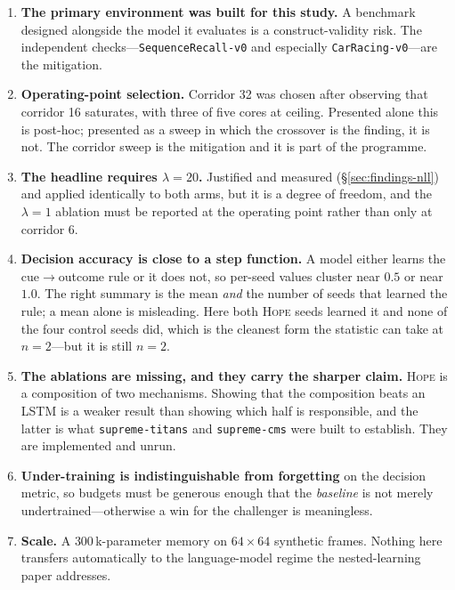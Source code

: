 \documentclass[11pt,a4paper]{article}
\newcommand{\code}[1]{\texttt{\small #1}}
\begin{document}
\begin{enumerate}[leftmargin=*]
\item \textbf{The primary environment was built for this study.} A benchmark
designed alongside the model it evaluates is a construct-validity risk. The
independent checks---\code{SequenceRecall-v0} and especially
\code{CarRacing-v0}---are the mitigation.
\item \textbf{Operating-point selection.} Corridor 32 was chosen after observing
that corridor 16 saturates, with three of five cores at ceiling. Presented alone
this is post-hoc; presented as a sweep in which the crossover is the finding, it
is not. The corridor sweep is the mitigation and it is part of the programme.
\item \textbf{The headline requires $\lambda=20$.} Justified and measured
(\S\ref{sec:findings-nll}) and applied identically to both arms, but it is a
degree of freedom, and the $\lambda=1$ ablation must be reported at the operating
point rather than only at corridor 6.
\item \textbf{Decision accuracy is close to a step function.} A model either
learns the cue$\rightarrow$outcome rule or it does not, so per-seed values cluster
near $0.5$ or near $1.0$. The right summary is the mean \emph{and} the number of
seeds that learned the rule; a mean alone is misleading. Here both \textsc{Hope}
seeds learned it and none of the four control seeds did, which is the cleanest
form the statistic can take at $n=2$---but it is still $n=2$.

\item \textbf{The ablations are missing, and they carry the sharper claim.}
\textsc{Hope} is a composition of two mechanisms. Showing that the composition
beats an LSTM is a weaker result than showing which half is responsible, and the
latter is what \code{supreme-titans} and \code{supreme-cms} were built to
establish. They are implemented and unrun.
\item \textbf{Under-training is indistinguishable from forgetting} on the
decision metric, so budgets must be generous enough that the \emph{baseline} is
not merely undertrained---otherwise a win for the challenger is meaningless.
\item \textbf{Scale.} A $300$\,k-parameter memory on $64\times64$ synthetic
frames. Nothing here transfers automatically to the language-model regime the
nested-learning paper addresses.
\end{enumerate}

\end{document}

